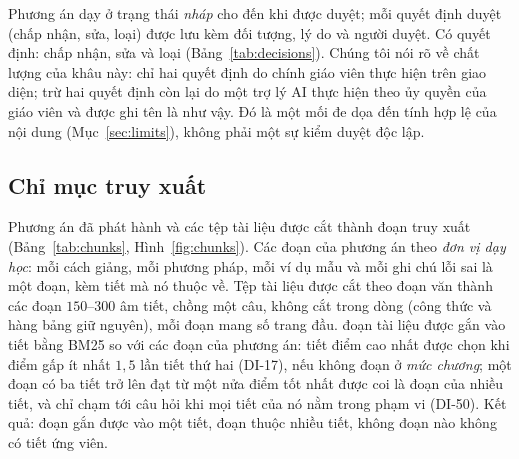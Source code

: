 \begin{table}[tbp]
\centering
\caption{Các đoạn do mô hình soạn và tỉ lệ qua kiểm.}
\label{tab:drafts}

\end{table}

\begin{table}[tp]
\centering
\caption{Lý do đoạn nháp bị bỏ (một đoạn có thể bị bỏ vì nhiều lý do).}
\label{tab:draftcodes}

\end{table}

Phương án dạy ở trạng thái \emph{nháp} cho đến khi được duyệt; mỗi quyết định duyệt (chấp nhận, sửa, loại) được lưu kèm đối tượng, lý do và người duyệt. Có \NDecisions{} quyết định: \NApprove{} chấp nhận, \NEdit{} sửa và \NReject{} loại (Bảng~\ref{tab:decisions}). Chúng tôi nói rõ về chất lượng của khâu này: chỉ hai quyết định do chính giáo viên thực hiện trên giao diện; \NDecisions{} trừ hai quyết định còn lại do một trợ lý AI thực hiện theo ủy quyền của giáo viên và được ghi tên là như vậy. Đó là một mối đe dọa đến tính hợp lệ của nội dung (Mục~\ref{sec:limits}), không phải một sự kiểm duyệt độc lập.

\begin{table}[tbp]
\centering
\caption{Các quyết định duyệt phương án dạy theo đối tượng.}
\label{tab:decisions}

\end{table}

\begin{table}[tbp]
\centering
\caption{Thống kê phương án dạy của hai chương.}
\label{tab:plan-stats}

\end{table}

\subsection{Chỉ mục truy xuất}\label{sec:index}
Phương án đã phát hành và các tệp tài liệu được cắt thành \NChunks{} đoạn truy xuất (Bảng~\ref{tab:chunks}, Hình~\ref{fig:chunks}). Các đoạn của phương án theo \emph{đơn vị dạy học}: mỗi cách giảng, mỗi phương pháp, mỗi ví dụ mẫu và mỗi ghi chú lỗi sai là một đoạn, kèm tiết mà nó thuộc về. Tệp tài liệu được cắt theo đoạn văn thành các đoạn $150$--$300$ âm tiết, chồng một câu, không cắt trong dòng (công thức và hàng bảng giữ nguyên), mỗi đoạn mang số trang đầu. \NPassages{} đoạn tài liệu được gắn vào tiết bằng BM25 so với các đoạn của phương án: tiết điểm cao nhất được chọn khi điểm gấp ít nhất $1{,}5$ lần tiết thứ hai (DI-17), nếu không đoạn ở \emph{mức chương}; một đoạn có ba tiết trở lên đạt từ một nửa điểm tốt nhất được coi là đoạn của nhiều tiết, và chỉ chạm tới câu hỏi khi mọi tiết của nó nằm trong phạm vi (DI-50). Kết quả: \NPassagesTied{} đoạn gắn được vào một tiết, \NPassagesSpread{} đoạn thuộc nhiều tiết, không đoạn nào không có tiết ứng viên.

